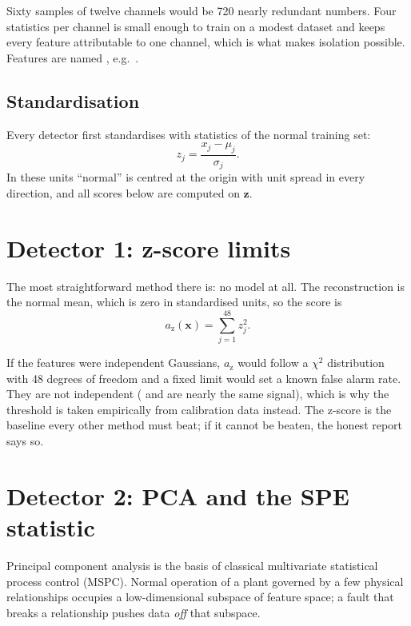 Sixty samples of twelve channels would be 720 nearly redundant numbers. Four
statistics per channel is small enough to train on a modest dataset and keeps
every feature attributable to one channel, which is what makes isolation
possible. Features are named , e.g.\
.

\subsection{Standardisation}
Every detector first standardises with statistics of the normal training set:
\begin{equation}
  z_j = \frac{x_j - \mu_j}{\sigma_j}.
\end{equation}
In these units ``normal'' is centred at the origin with unit spread in every
direction, and all scores below are computed on $\bm z$.

\section{Detector 1: z-score limits}

The most straightforward method there is: no model at all. The reconstruction
is the normal mean, which is zero in standardised units, so the score is
\begin{equation}
  a_\text{z}(\bm x) = \sum_{j=1}^{48} z_j^2 .
\end{equation}

\begin{theory}[Interpretation]
If the features were independent Gaussians, $a_\text{z}$ would follow a
$\chi^2$ distribution with 48 degrees of freedom and a fixed limit would set a
known false alarm rate. They are not independent (\tg{LT101} and
\tg{LIC101_ERR} are nearly the same signal), which is why the threshold is
taken empirically from calibration data instead. The z-score is the baseline
every other method must beat; if it cannot be beaten, the honest report says
so.
\end{theory}

\section{Detector 2: PCA and the SPE statistic}

Principal component analysis is the basis of classical multivariate
statistical process control (MSPC). Normal operation of a plant governed by a
few physical relationships occupies a low-dimensional subspace of feature
space; a fault that breaks a relationship pushes data \emph{off} that
subspace.

